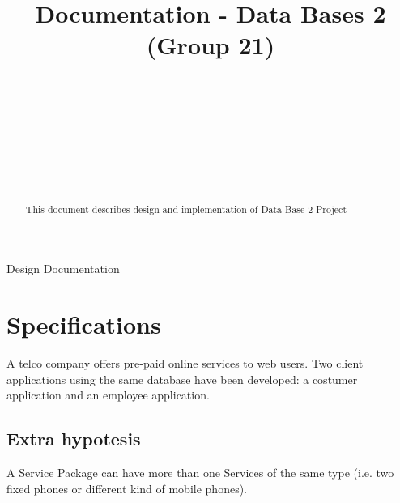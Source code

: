 \documentclass{article}
\begin{document}
\lstset{language=SQL}
\title{Documentation - Data Bases 2 (Group 21)%
%
}

\author{\\[2pt] 
\\
\\
\and
\\
\\
\\
}

%
%
{Design Documentation}

\maketitle

\begin{abstract}
This document describes design and implementation of Data Base 2 Project
\end{abstract}

\section{Specifications}
\label{intro}
A telco company offers pre-paid online services to web users. Two client applications using the same database have been developed: a costumer application and an employee application.
\subsection{Extra hypotesis}
A Service Package can have more than one Services of the same type (i.e. two fixed phones or different kind of mobile phones).
\end{document}
